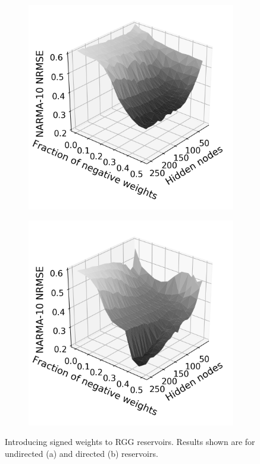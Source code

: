 \begin{figure}[htb]
  \centering
  \begin{subfigure}{.49\textwidth}
    \centering
    \includegraphics[width=1.0\linewidth]{figures/perf-rest-undir.png}
    \caption{}
    \label{fig:perf-restore-a}
  \end{subfigure}
  \begin{subfigure}{.49\textwidth}
    \centering
    \includegraphics[width=1.0\linewidth]{figures/perf-rest-dir.png}
    \caption{}
    \label{fig:perf-restore-b}
  \end{subfigure}
  \caption{
    Introducing signed weights to RGG reservoirs. Results shown are for
undirected (a) and directed (b) reservoirs.
  }
  \label{fig:perf-restore}
\end{figure}

